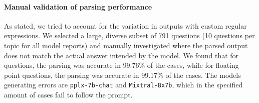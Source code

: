 \paragraph*{Manual validation of parsing performance}

As stated, we tried to account for the variation in outputs with custom regular expressions.
We selected a large, diverse subset of 791 questions (10 questions per topic for all model reports) and manually investigated where the parsed output does not match the actual answer intended by the model.
We found that for  questions, the parsing was accurate in 99.76\% of the cases, while for floating point questions, the parsing was accurate in 99.17\% of the cases.
The models generating errors are \texttt{pplx-7b-chat} and \texttt{Mixtral-8x7b}, which in the specified amount of cases fail to follow the prompt.
